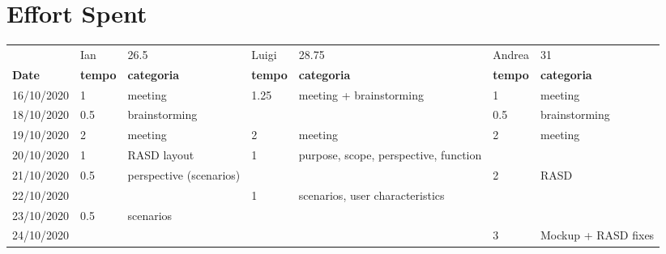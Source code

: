 
\section{Effort Spent}\label{sec:effort}

\begin{table}
    \begin{tabular}{|l|l|l|l|l|l|l|}
                  & Ian            & 26.5                          & Luigi          & 28.75                                 & Andrea         & 31                                        \\
    \textbf{Date} & \textbf{tempo} & \textbf{categoria}            & \textbf{tempo} & \textbf{categoria}                    & \textbf{tempo} & \textbf{categoria}                        \\
    16/10/2020    & 1              & meeting                       & 1.25           & meeting + brainstorming               & 1              & meeting                                   \\
    18/10/2020    & 0.5            & brainstorming                 &                &                                       & 0.5            & brainstorming                             \\
    19/10/2020    & 2              & meeting                       & 2              & meeting                               & 2              & meeting                                   \\
    20/10/2020    & 1              & RASD layout                   & 1              & purpose, scope, perspective, function &                &                                           \\
    21/10/2020    & 0.5            & perspective (scenarios)       &                &                                       & 2              & RASD                                      \\
    22/10/2020    &                &                               & 1              & scenarios, user characteristics       &                &                                           \\
    23/10/2020    & 0.5            & scenarios                     &                &                                       &                &                                           \\
    24/10/2020    &                &                               &                &                                       & 3              & Mockup + RASD fixes                       \\

\end{tabular}
\end{table}
